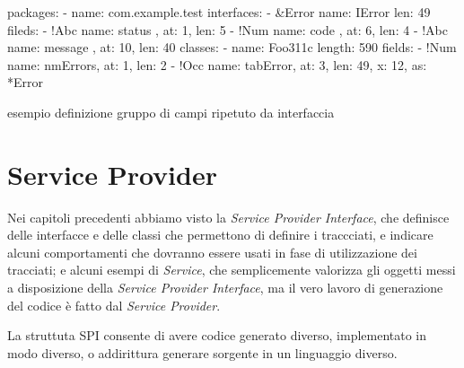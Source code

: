 \documentclass[a4paper,10pt]{report}
\newif\ifesource
\newenvironment{elisting}[1][!htb]
  {\captionsetup{aboveskip=0pt}\begin{listing}[#1]}
  {\end{listing}%
}
\begin{document}
\ifesource
\begin{figure*}[!htb]
\begin{lstlisting}[language=yaml, 
caption={esempio definizione gruppo di campi ripetuto da interfaccia}, 
label=lst:xmplIOcc]
packages:
  - name: com.example.test
    interfaces:
      - &Error
        name: IError
        len: 49
        fileds:
          - !Abc { name: status  , at:  1, len:  5}
          - !Num { name: code    , at:  6, len:  4}
          - !Abc { name: message , at: 10, len: 40}
    classes:
      - name: Foo311c
        length: 590
        fields:
          - !Num { name: nmErrors, at: 1, len: 2}
          - !Occ { name: tabError, at: 3, len: 49, x: 12, as: *Error }
\end{lstlisting}
\end{figure*}
\else
\begin{elisting}
\begin{yamlcode}
packages:
  - name: com.example.test
    interfaces:
      - &Error
        name: IError
        len: 49
        fileds:
          - !Abc { name: status  , at:  1, len:  5}
          - !Num { name: code    , at:  6, len:  4}
          - !Abc { name: message , at: 10, len: 40}
    classes:
      - name: Foo311c
        length: 590
        fields:
          - !Num { name: nmErrors, at: 1, len: 2}
          - !Occ { name: tabError, at: 3, len: 49, x: 12, as: *Error }
\end{yamlcode}
\caption{esempio definizione gruppo di campi ripetuto da interfaccia}
\label{lst:xmplIOcc}
\end{elisting}
\fi


\chapter{Service Provider}
Nei capitoli precedenti abbiamo visto la \textsl{Service Provider Interface}, 
che  definisce delle interfacce e delle classi che permettono di definire i 
traccciati, e indicare alcuni comportamenti che dovranno essere usati in fase di
utilizzazione dei tracciati; e alcuni esempi di \textsl{Service}, che
semplicemente valorizza gli oggetti messi a disposizione della 
\textsl{Service Provider Interface}, ma il vero lavoro di generazione del codice 
è fatto dal \textsl{Service Provider}.

La struttuta SPI consente di avere codice generato diverso, implementato in modo
diverso, o addirittura generare sorgente in un linguaggio diverso.
\end{document}
